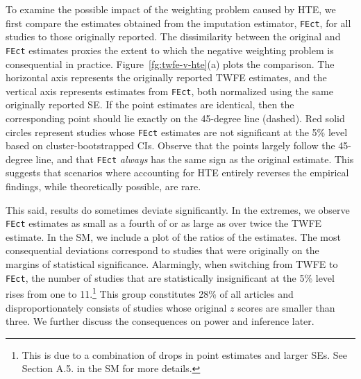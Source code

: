 \documentclass[12pt]{article}
\begin{document}
To examine the possible impact of the weighting problem caused by HTE, we first compare the estimates obtained from the imputation estimator, \texttt{FEct}, for all studies to those originally reported. The dissimilarity between the original and \texttt{FEct} estimates proxies the extent to which the negative weighting problem is consequential in practice. Figure~\ref{fg:twfe-v-hte}(a) plots the comparison. The horizontal axis represents the originally reported TWFE estimates, and the vertical axis represents estimates from \texttt{FEct}, both normalized using the same originally reported SE. If the point estimates are identical, then the corresponding point should lie exactly on the 45-degree line (dashed). Red solid circles represent studies whose \texttt{FEct} estimates are not significant at the 5\% level based on cluster-bootstrapped CIs. Observe that the points largely follow the 45-degree line, and that \texttt{FEct} \emph{always} has the same sign as the original estimate. This suggests that scenarios where accounting for HTE entirely reverses the empirical findings, while theoretically possible, are rare. 

This said, results do sometimes deviate significantly. In the extremes, we observe \texttt{FEct} estimates as small as a fourth of or as large as over twice the TWFE estimate. In the SM, we include a plot of the ratios of the estimates. The most consequential deviations correspond to studies that were originally on the margins of statistical significance. 
Alarmingly, when switching from TWFE to \texttt{FEct}, the number of studies that are statistically insignificant at the 5\% level rises from one to 11.\footnote{This is due to a combination of drops in point estimates and larger SEs. See Section A.5. in the SM for more details.} This group constitutes 28\% of all articles and disproportionately consists of studies whose original $z$ scores are smaller than three. We further discuss the consequences on power and inference later. 
\end{document}
